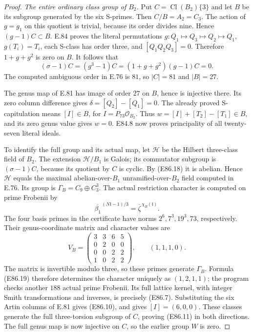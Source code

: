 \begin{proof}
\emph{The entire ordinary class group of $B_2$.}
Put $C=\operatorname{Cl}(B_2)\{3\}$ and let $B$
be its subgroup generated by the six S-primes.
Then $C/B=A_2=C_3$. The action of $g=g_1$ on
this quotient is trivial, because its order
divides nine. Hence $(g-1)C\subset B$.
E.84 proves the literal permutations
$g:Q_1\mapsto Q_3\mapsto Q_2\mapsto Q_1$,
$g(T_i)=T_i$, each S-class has order three,
and $[Q_1Q_2Q_3]=0$. Therefore
$1+g+g^2$ is zero on $B$. It follows that
\[
 (\sigma-1)C=(g^3-1)C
             =(1+g+g^2)(g-1)C=0.
 \tag{E86.18}
\]
The computed ambiguous order in E.76 is $81$,
so $|C|=81$ and $|B|=27$.

The genus map of E.81 has image of order $27$
on $B$, hence is injective there. Its zero
column difference gives $\delta=[Q_2]-[Q_1]=0$.
The already proved S-capitulation means
$[I]\in B$, for $I=P_{73}\mathcal O_{B_2}$.
Thus $w=[I]+[T_2]-[T_1]\in B$, and its zero
genus value gives $w=0$. E84.8 now proves
principality of all twenty-seven literal ideals.

To identify the full group and its actual map,
let $\mathcal H$ be the Hilbert three-class field
of $B_2$. The extension $\mathcal H/B_1$ is
Galois; its commutator subgroup is
$(\sigma-1)C$, because its quotient by $C$ is
cyclic. By (E86.18) it is abelian. Hence
$\mathcal H$ equals the maximal abelian-over-$B_1$
unramified-over-$B_2$ field computed in E.76.
Its group is $\Gamma_B=C_9\oplus C_3^3$.
The actual restriction character is computed
on prime Frobenii by
\[
 \overline{\beta_1}^{\,(N\mathfrak l-1)/3}
          =\overline\zeta^{\,\chi_B(\mathfrak l)}.
 \tag{E86.19}
\]
The four basis primes in the certificate have
norms $2^6,7^3,19^3,73$, respectively. Their
genus-coordinate matrix and character values are
\[
 V_B=\begin{pmatrix}3&3&6&5\\0&2&0&0\\
                    0&0&2&2\\1&0&2&2\end{pmatrix},
 \qquad (1,1,1,0).
 \tag{E86.20}
\]
The matrix is invertible modulo three, so these
primes generate $\Gamma_B$. Formula (E86.19)
therefore determines the character uniquely as
$(1,2,1,1)$; the program checks another $188$
actual prime Frobenii. Its full lattice kernel,
with integer Smith transformations and inverses,
is precisely (E86.7). Substituting the six
Artin columns of E.81 gives (E86.10), and gives
$[I]=(6,0,0)$. These classes generate the full
three-torsion subgroup of $C$, proving (E86.11)
in both directions. The full genus map is now
injective on $C$, so the earlier group $W$ is zero.


\end{proof}
